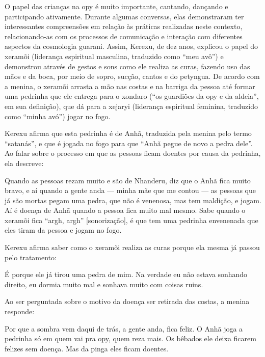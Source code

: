 \documentclass{article}
\begin{document}
O papel das crian\c{c}as na opy \'e muito importante, cantando,
dan\c{c}ando e participando ativamente. Durante algumas conversas, elas
demonstraram ter interessantes compreens\~oes em rela\c{c}\~ao \`as
pr\'aticas realizadas neste contexto, relacionando-as com os processos
de comunica\c{c}\~ao e intera\c{c}\~ao com diferentes aspectos da
cosmologia guarani. Assim, Kerexu, de dez anos, explicou o papel do
xeram\~oi (lideran\c{c}a espiritual masculina, traduzido como
{\textquotedblleft}meu av\^o{\textquotedblright}) e demonstrou
atrav\'es de gestos e sons como ele realiza as curas, fazendo uso das
m\~aos e da boca, por meio de sopro, suc\c{c}\~ao, cantos e do
petyngua. De acordo com a menina, o xeram\~oi arrasta a m\~ao nas
costas e na barriga da pessoa at\'e formar uma pedrinha que ele entrega
para o xondaro  ({\textquotedblleft}os guardi\~oes da opy e da
aldeia{\textquotedblright}, em sua defini\c{c}\~ao), que d\'a para a
xejaryi (lideran\c{c}a espiritual feminina, traduzido como
{\textquotedblleft}minha av\'o{\textquotedblright}) jogar no fogo. 

Kerexu afirma que esta pedrinha \'e de Anh\~a, traduzida pela menina
pelo termo {\textquotedblleft}satan\'as{\textquotedblright}, e que \'e
jogada no fogo para que {\textquotedblleft}Anh\~a pegue de novo a pedra
dele{\textquotedblright}. Ao falar sobre o processo em que as pessoas
ficam doentes por causa da pedrinha, ela descreve:

Quando as pessoas rezam muito e s\~ao de Nhanderu, diz que o Anh\~a fica
muito bravo, e a\'i quando a gente anda --- minha m\~ae que me contou
--- as pessoas que j\'a s\~ao mortas pegam uma pedra, que n\~ao \'e
venenosa, mas tem maldi\c{c}\~ao, e jogam. A\'i \'e doen\c{c}a de
Anh\~a quando a pessoa fica muito mal mesmo. Sabe quando o xeram\~oi
fica {\textquotedblleft}argh, argh{\textquotedblright}
[sonoriza\c{c}\~ao], \'e que tem uma pedrinha envenenada que eles tiram
da pessoa e jogam no fogo.

Kerexu afirma saber como o xeram\~oi realiza as curas porque ela mesma
j\'a passou pelo tratamento:

\'E porque ele j\'a tirou uma pedra de mim. Na verdade eu n\~ao estava
sonhando direito, eu dormia muito mal e sonhava muito com coisas ruins.

Ao ser perguntada sobre o motivo da doen\c{c}a ser retirada das costas,
a menina responde:

Por que a sombra vem daqui de tr\'as, a gente anda, fica feliz. O Anh\~a
joga a pedrinha s\'o em quem vai pra opy, quem reza mais. Os b\^ebados
ele deixa ficarem felizes sem doen\c{c}a. Mas da pinga eles ficam
doentes.
\end{document}
